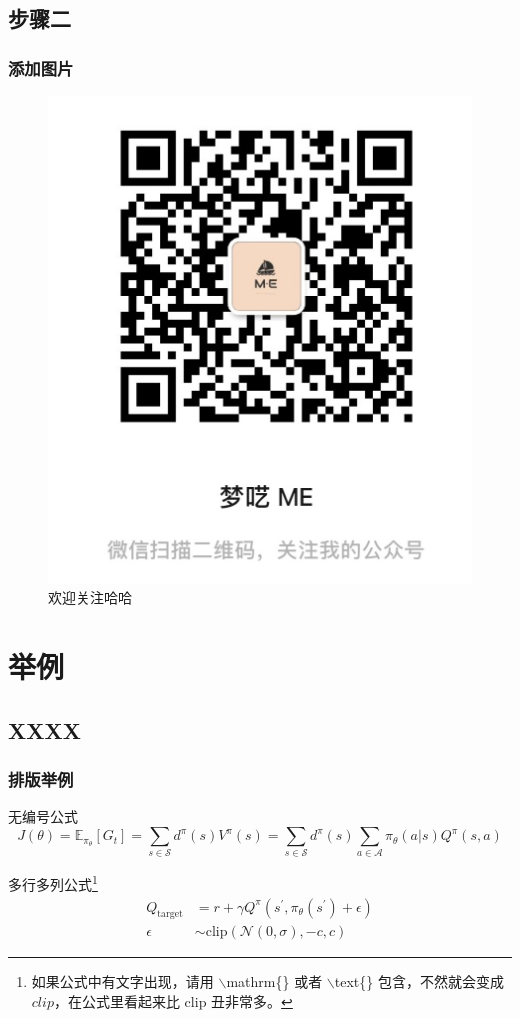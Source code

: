 \documentclass[AutoFakeBold,AutoFakeSlant]{beamer}
\begin{document}
\subsection{步骤二}

\begin{frame}
  \frametitle{添加图片}
\begin{figure}[H]
	\centering
	\includegraphics[width=0.5\linewidth]{figures/gzh}
	\caption{欢迎关注哈哈}
	\label{fig:gzh}
\end{figure}
\end{frame}

\section{举例}

\subsection{XXXX}

\begin{frame}
  \frametitle{排版举例}
  \begin{exampleblock}{无编号公式} %
  	\begin{equation*}
  		J(\theta) = \mathbb{E}_{\pi_\theta}[G_t] = \sum_{s\in\mathcal{S}} d^\pi (s)V^\pi(s)=\sum_{s\in\mathcal{S}} d^\pi(s)\sum_{a\in\mathcal{A}}\pi_\theta(a|s)Q^\pi(s,a)
  	\end{equation*}
  \end{exampleblock}
  \begin{exampleblock}{多行多列公式\footnote{\color{white}如果公式中有文字出现，请用 $\backslash$mathrm\{\} 或者 $\backslash$text\{\} 包含，不然就会变成 $clip$，在公式里看起来比 $\mathrm{clip}$ 丑非常多。}}
  	\begin{align}
  		Q_\mathrm{target}&=r+\gamma Q^\pi(s^\prime, \pi_\theta(s^\prime)+\epsilon)\\
  		\epsilon&\sim\mathrm{clip}(\mathcal{N}(0, \sigma), -c, c)\nonumber
  	\end{align}
  \end{exampleblock}
\end{frame}
\end{document}
